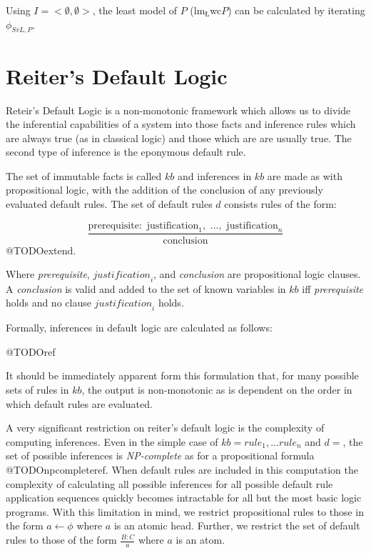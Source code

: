 Using $I=<\emptyset, \emptyset>$, the least model of $P$ ($\textrm{lm}_\textrm{\L}$wc$P$) can be calculated by iterating $\phi_{SvL,P}$.

\section{Reiter's Default Logic}
Reteir's Default Logic \citep{reiter1980logic} is a non-monotonic framework which allows us to divide the inferential capabilities of a system into those facts and inference rules which are always true (as in classical logic) and those which are are usually true. The second type of inference is the eponymous default rule.

The set of immutable facts is called $kb$ and inferences in $kb$ are made as with propositional logic, with the addition of the conclusion of any previously evaluated default rules. The set of default rules $d$ consists rules of the form:

\[\frac{\textrm{prerequisite}:\textrm{ justification}_1, \textrm{ ...}, \textrm{ justification}_n}{\textrm{conclusion}}\] @TODOextend.

Where \textit{prerequisite}, $\textit{justification}_i$, and \textit{conclusion} are propositional logic clauses. A \textit{conclusion} is valid and added to the set of known variables in $kb$ iff \textit{prerequisite} holds and no clause $\textit{justification}_i$ holds.

Formally, inferences in default logic are calculated as follows:

@TODOref

It should be immediately apparent form this formulation that, for many possible sets of rules in $kb$, the output is non-monotonic as is dependent on the order in which default rules are evaluated.

A very significant restriction on reiter's default logic is the complexity of computing inferences. Even in the simple case of $kb={rule_1,...rule_n}$ and $d={}$, the set of possible inferences is \textit{NP-complete} as for a propositional formula @TODOnpcompleteref. When default rules are included in this computation the complexity of calculating all possible inferences for all possible default rule application sequences quickly becomes intractable for all but the most basic logic programs. With this limitation in mind, we restrict propositional rules to those in the form $a\leftarrow\phi$ where $a$ is an atomic head. Further, we restrict the set of default rules to those of the form $\frac{B:C}{a}$ where $a$ is an atom.